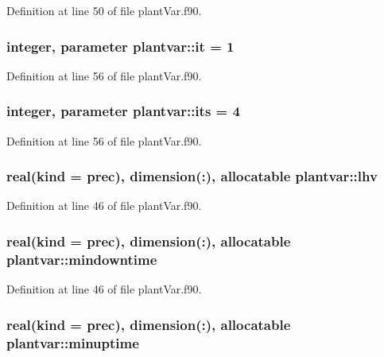 Definition at line 50 of file plant\-Var.\-f90.

\hypertarget{classplantvar_ae20b71682087261a45478790df439eb9}{
\subsubsection[{it}]{\setlength{\rightskip}{0pt plus 5cm}integer, parameter plantvar\-::it = 1}}\label{classplantvar_ae20b71682087261a45478790df439eb9}


Definition at line 56 of file plant\-Var.\-f90.

\hypertarget{classplantvar_aaa8d59ae7b5ae7303a9b5bd17499ce56}{
\subsubsection[{its}]{\setlength{\rightskip}{0pt plus 5cm}integer, parameter plantvar\-::its = 4}}\label{classplantvar_aaa8d59ae7b5ae7303a9b5bd17499ce56}


Definition at line 56 of file plant\-Var.\-f90.

\hypertarget{classplantvar_a8c41db489c4d6b494849ab3c82833e29}{
\subsubsection[{lhv}]{\setlength{\rightskip}{0pt plus 5cm}real(kind = prec), dimension(\-:), allocatable plantvar\-::lhv}}\label{classplantvar_a8c41db489c4d6b494849ab3c82833e29}


Definition at line 46 of file plant\-Var.\-f90.

\hypertarget{classplantvar_a9320c1f8ded834439390cb5602c19863}{
\subsubsection[{mindowntime}]{\setlength{\rightskip}{0pt plus 5cm}real(kind = prec), dimension(\-:), allocatable plantvar\-::mindowntime}}\label{classplantvar_a9320c1f8ded834439390cb5602c19863}


Definition at line 46 of file plant\-Var.\-f90.

\hypertarget{classplantvar_aa1e10cfba7b7a224f760c1087d2add6d}{
\subsubsection[{minuptime}]{\setlength{\rightskip}{0pt plus 5cm}real(kind = prec), dimension(\-:), allocatable plantvar\-::minuptime}}\label{classplantvar_aa1e10cfba7b7a224f760c1087d2add6d}


